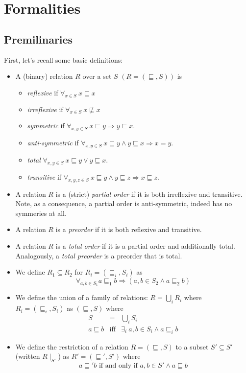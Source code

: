 \documentclass[12pt]{article}
\def\implies{\Rightarrow}
\theoremstyle{definition}
\theoremstyle{theorem}
\begin{document}
\section{Formalities}

\subsection{Premilinaries}

First, let's recall some basic definitions:
\begin{itemize}
\item A (binary) relation $R$ over a set $S$ \(\left(R=(\sqsubseteq,S)\right)\) is
  \begin{itemize}
  \item \emph{reflexive} if \(\forall_{x\in S}\:  x \sqsubseteq x\)
  \item \emph{irreflexive} if \(\forall_{x\in S}\:  x \not\sqsubseteq x\)
  \item \emph{symmetric} if \(\forall_{x,y \in S}\: x \sqsubseteq y \implies y \sqsubseteq x \).
  \item \emph{anti-symmetric} if \(\forall_{x,y \in S}\: x \sqsubseteq y \wedge y \sqsubseteq x \implies x = y\).
    \item \emph{total} \(\forall_{x,y \in S}\: x \sqsubseteq y \vee y \sqsubseteq x\).
  \item \emph{transitive} if \( \forall_{x,y,z \in S}\: x \sqsubseteq y \wedge y \sqsubseteq z \implies x \sqsubseteq z\).
  \end{itemize}
\item A relation $R$ is a (strict) \emph{partial order} if it is both irreflexive and transitive.
  Note, as a consequence, a partial order is anti-symmetric, indeed has no symmeries at all.
  \item A relation $R$ is a \emph{preorder} if it is both reflexive and transitive.
  \item A relation $R$ is a \emph{total order} if it is a partial order and additionally total.  Analogously, a \emph{total preorder} is a preorder that is total.
  \item We define $R_1 \subseteq R_2$ for \( R_i = (\sqsubseteq_i,S_i)\) as
    \[
    \forall_{a,b \in S_1} a \sqsubseteq_1 b \implies \left( a,b \in S_2 \wedge
    a \sqsubseteq_2 b \right)
    \]
  \item We define the union of a family of relations: \( R = \bigcup_i R_i
    \) where \( R_i = (\sqsubseteq_i, S_i) \) as \( (\sqsubseteq,S) \)
    where
    \begin{eqnarray*}
      S &=& \bigcup_i S_i \\
      a \sqsubseteq b &\textrm{iff}& \exists_i\: a,b \in S_i \wedge a
      \sqsubseteq_i b
    \end{eqnarray*}
    \item We define the restriction of a relation
      \(R=(\sqsubseteq,S)\) to a subset $S'\subseteq S'$ (written
      $R\mid_{S'}$) as \(R' =
      (\sqsubseteq',S')\) where
      \[
      a \sqsubseteq' b \textrm{ if and only if } a,b \in S' \wedge a
      \sqsubseteq b
      \]
\end{itemize}
\end{document}
